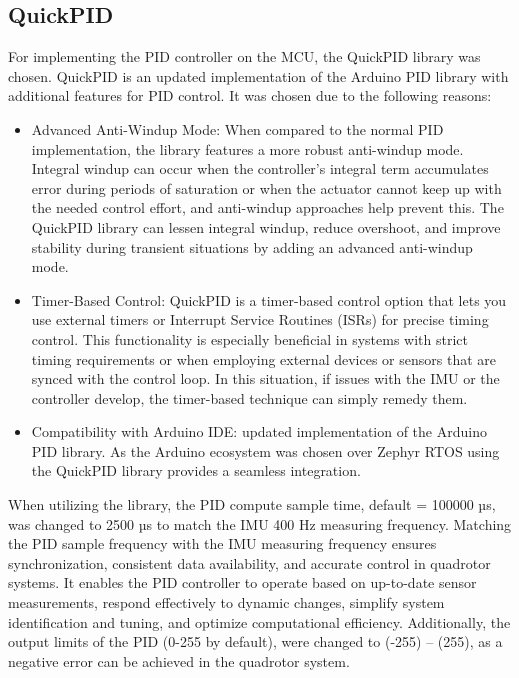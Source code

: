 \subsection{QuickPID}
For implementing the PID controller on the MCU, the QuickPID library was chosen. QuickPID is an updated implementation of the Arduino PID library with additional features for PID control. \cite{QuickPID} It was chosen due to the following reasons:
\begin{itemize}
    \item
        Advanced Anti-Windup Mode: When compared to the normal PID implementation, the library features a more robust anti-windup mode. Integral windup can occur when the controller's integral term accumulates error during periods of saturation or when the actuator cannot keep up with the needed control effort, and anti-windup approaches help prevent this. \cite{QuickPID} The QuickPID library can lessen integral windup, reduce overshoot, and improve stability during transient situations by adding an advanced anti-windup mode.
    \item
    	Timer-Based Control: QuickPID is a timer-based control option that lets you use external timers or Interrupt Service Routines (ISRs) for precise timing control. \cite{QuickPID} This functionality is especially beneficial in systems with strict timing requirements or when employing external devices or sensors that are synced with the control loop. In this situation, if issues with the IMU or the controller develop, the timer-based technique can simply remedy them.
    \item
    	Compatibility with Arduino IDE: updated implementation of the Arduino PID library. As the Arduino ecosystem was chosen over Zephyr RTOS using the QuickPID library provides a seamless integration.
\end{itemize}
When utilizing the library, the PID compute sample time, default = 100000 µs, was changed to 2500 µs to match the IMU 400 Hz measuring frequency. Matching the PID sample frequency with the IMU measuring frequency ensures synchronization, consistent data availability, and accurate control in quadrotor systems. It enables the PID controller to operate based on up-to-date sensor measurements, respond effectively to dynamic changes, simplify system identification and tuning, and optimize computational efficiency. Additionally, the output limits of the PID (0-255 by default), were changed to (-255) – (255), as a negative error can be achieved in the quadrotor system.
